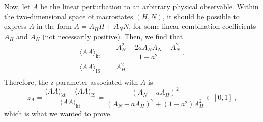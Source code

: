 \documentclass[aps,prd,preprint,nofootinbib,amsmath,amssymb,showpacs,longbibliography,singlecolumn,superscriptaddress,10pt]{revtex4-1}
\theoremstyle{plain}
\theoremstyle{definition}
\begin{document}
Now, let $A$ be the linear perturbation to an arbitrary physical observable. Within the two-dimensional space of macrostates $(H,N)$, it should be possible to express $A$ in the form $A=A_H H+A_N N$, for some linear-combination coefficients $A_H$ and $A_N$ (not necessarily positive). Then, we find that
\begin{equation}
    \begin{split}
\langle AA \rangle_{\text{kt}} ={}& \dfrac{A_H^2-2aA_H A_N + A_N^2}{1-a^2} \, , \\
\langle AA \rangle_{\text{IS}} ={}& A_H^2 \, . \\
    \end{split}
\end{equation}
Therefore, the z-parameter associated with $A$ is
\begin{equation}
    z_A = \dfrac{\langle AA\rangle_{\text{kt}}-\langle AA\rangle_{\text{IS}}}{\langle AA\rangle_{\text{kt}}} = \dfrac{(A_N{-}aA_H)^2}{(A_N{-}aA_H)^2+(1{-}a^2)A_H^2} \in [0,1] \, ,
\end{equation}
which is what we wanted to prove. 
\end{document}
